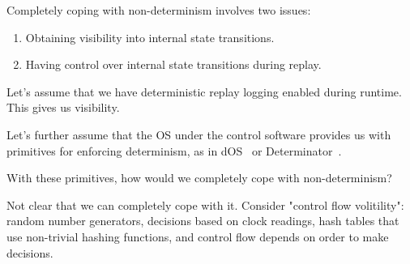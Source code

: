 
Completely coping with non-determinism involves two issues:
\begin{enumerate}
\item Obtaining visibility into internal state transitions.
\item Having control over internal state transitions during replay.
\end{enumerate}

Let's assume that we have deterministic replay logging enabled during runtime. This gives us
visibility.

Let's further assume that the OS under the control software provides us with primitives for enforcing determinism,
as in dOS~\cite{bergan2010deterministic} or Determinator~\cite{aviram2012efficient}.

With these primitives, how would we completely cope with non-determinism?

Not clear that we can completely cope with it. Consider "control flow
volitility": random number
generators, decisions based on clock readings, hash tables that use
non-trivial hashing functions, and control flow depends on order to make decisions.
